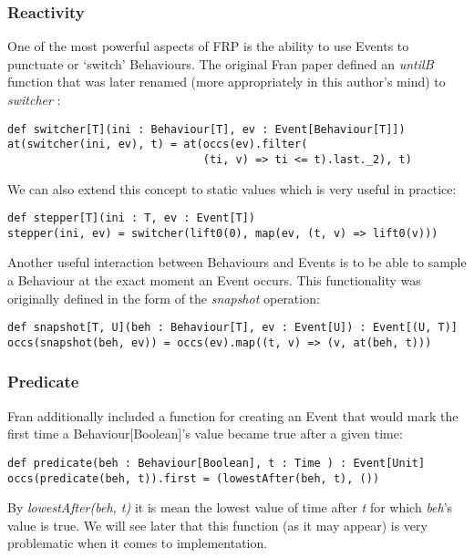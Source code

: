       \subsubsection{Reactivity}
        One of the most powerful aspects of FRP is the ability to use Events to punctuate or `switch' Behaviours.
        The original Fran paper defined an \emph{untilB} function that was later renamed (more appropriately in this
        author's mind) to \emph{switcher} \cite{Elliott2009}:

\begin{verbatim}
def switcher[T](ini : Behaviour[T], ev : Event[Behaviour[T]])
at(switcher(ini, ev), t) = at(occs(ev).filter(
                              (ti, v) => ti <= t).last._2), t)
\end{verbatim}

        We can also extend this concept to static values which is very useful in practice:
      
\begin{verbatim}  
def stepper[T](ini : T, ev : Event[T])
stepper(ini, ev) = switcher(lift0(0), map(ev, (t, v) => lift0(v)))    
\end{verbatim}

        Another useful interaction between Behaviours and Events is to be able to sample
        a Behaviour at the exact moment an Event occurs. This functionality was originally defined in the
        form of the \emph{snapshot} operation:

\begin{verbatim}
def snapshot[T, U](beh : Behaviour[T], ev : Event[U]) : Event[(U, T)]
occs(snapshot(beh, ev)) = occs(ev).map((t, v) => (v, at(beh, t)))
\end{verbatim} 

    \subsubsection{Predicate}
      Fran additionally included a function for creating an Event that would mark the first
      time a Behaviour[Boolean]'s value became true after a given time:
      
\begin{verbatim}
def predicate(beh : Behaviour[Boolean], t : Time ) : Event[Unit]
occs(predicate(beh, t)).first = (lowestAfter(beh, t), ())
\end{verbatim}  

      By \emph{lowestAfter(beh, t)} it is mean the lowest value of time after \emph{t} for which 
      \emph{beh}'s value is true. We will see later that this function (as it may appear) is very problematic when
      it comes to implementation.
  
